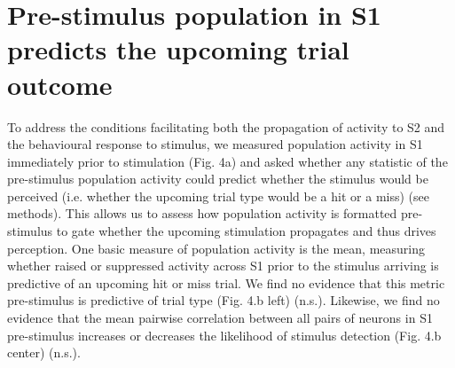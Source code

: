 \section{Pre-stimulus population in S1 predicts the upcoming trial outcome}

To address the conditions facilitating both the propagation of activity to S2 and the behavioural response to stimulus, we measured population activity in S1 immediately prior to stimulation (Fig. 4a) and asked whether any statistic of the pre-stimulus population activity could predict whether the stimulus would be perceived (i.e. whether the upcoming trial type would be a hit or a miss) (see methods). This allows us to assess how population activity is formatted pre-stimulus to gate whether the upcoming stimulation propagates and thus drives perception. One basic measure of population activity is the mean, measuring whether raised or suppressed activity across S1 prior to the stimulus arriving is predictive of an upcoming hit or miss trial. We find no evidence that this metric pre-stimulus is predictive of trial type (Fig. 4.b left) (n.s.). Likewise, we find no evidence that the mean pairwise correlation between all pairs of neurons in S1 pre-stimulus increases or decreases the likelihood of stimulus detection (Fig. 4.b center) (n.s.). 


